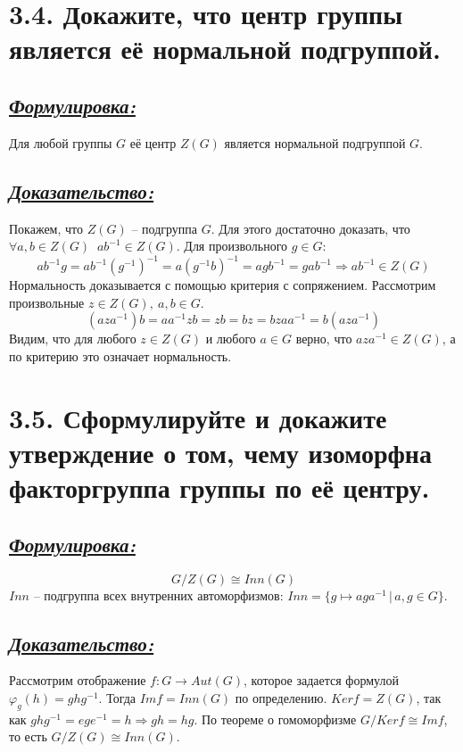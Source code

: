 \documentclass{article}
\begin{document}
\section*{\LARGE 3.4. Докажите, что центр группы является её нормальной подгруппой. }
\subsection*{\Large \underline{\textit{Формулировка: }}}
Для любой группы $G$ её центр $Z(G)$ является нормальной подгруппой $G$.

\subsection*{\Large \underline{\textit{Доказательство: }}}
Покажем, что $Z(G)$ -- подгруппа $G$. Для этого достаточно доказать, что
\newline $\forall a,b \in Z(G) \;\; a b^{-1} \in Z(G)$. Для произвольного $g \in G$:
$$
a b^{-1}  g = a b^{-1}(g^{-1})^{-1} = a(g^{-1} b)^{-1} = a g  b^{-1} = g  a  b^{-1} \Rightarrow a b^{-1} \in Z(G)
$$
Нормальность доказывается с помощью критерия с сопряжением. Рассмотрим произвольные $z\in Z(G), \: a, b \in G$.
$$ 
(a z a^{-1}) b = a a^{-1}  z  b = z  b = b  z = b  z  a  a^{-1} = b  (a   z   a^{-1})
$$
Видим, что для любого $z \in Z(G)$ и любого $a \in G$ верно, что $aza^{-1}\in Z(G)$, а по критерию это означает нормальность.

\section*{\LARGE 3.5. Сформулируйте и докажите утверждение о том, чему изоморфна факторгруппа группы по её центру. }
\subsection*{\Large \underline{\textit{Формулировка: }}}
$$G/Z(G) \cong Inn(G)$$
$Inn$ -- подгруппа всех внутренних автоморфизмов: $Inn = \{g \mapsto aga^{-1}\,|\, a,g \in G\}$.

\subsection*{\Large \underline{\textit{Доказательство:}}}
Рассмотрим отображение $f : G \rightarrow Aut(G)$, которое задается формулой 
\newline $\varphi_g(h) = ghg^{-1}$. Тогда $Imf = Inn(G)$ по определению. $Kerf = Z(G)$, так как $ghg^{-1} = ege^{-1} = h \Rightarrow gh = hg$. По теореме о гомоморфизме $G / Kerf \cong Imf$, то есть $G / Z(G) \cong Inn(G)$. 
\end{document}
